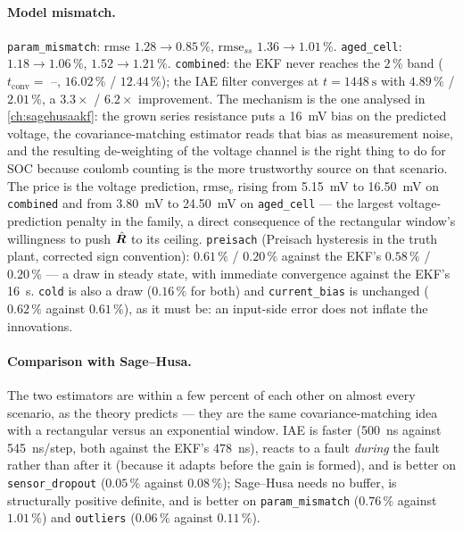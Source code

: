 \paragraph{Model mismatch.}  \texttt{param\_mismatch}: $\mathrm{rmse}$ $1.28\to0.85\,\%$,
$\mathrm{rmse}_{ss}$ $1.36\to1.01\,\%$.  \texttt{aged\_cell}: $1.18\to1.06\,\%$,
$1.52\to1.21\,\%$.  \texttt{combined}: the EKF never reaches the $2\,\%$ band
($t_\mathrm{conv}=$ --, $16.02\,\%$ / $12.44\,\%$); the IAE filter converges at
$t=\SI{1448}{\second}$ with $4.89\,\%$ / $\mathbf{2.01\,\%}$, a $3.3\times$ / $6.2\times$
improvement.  The mechanism is the one analysed in \cref{ch:sagehusaakf}: the grown series
resistance puts a \SI{16}{\milli\volt} bias on the predicted voltage, the covariance-matching
estimator reads that bias as measurement noise, and the resulting de-weighting of the voltage channel
is the right thing to do for SOC because coulomb counting is the more trustworthy source on that
scenario.  The price is the voltage prediction, $\mathrm{rmse}_v$ rising from \SI{5.15}{\milli\volt}
to \SI{16.50}{\milli\volt} on \texttt{combined} and from \SI{3.80}{\milli\volt} to
\SI{24.50}{\milli\volt} on \texttt{aged\_cell} --- the largest voltage-prediction penalty in the
family, a direct consequence of the rectangular window's willingness to push $\hat{\bm{R}}$ to its
ceiling.  \texttt{preisach} (Preisach hysteresis in the truth plant, corrected sign convention):
$0.61\,\%$ / $0.20\,\%$ against the EKF's $0.58\,\%$ / $0.20\,\%$ --- a draw in steady state, with
immediate convergence against the EKF's \SI{16}{\second}.  \texttt{cold} is also a draw
($0.16\,\%$ for both) and \texttt{current\_bias} is unchanged ($0.62\,\%$ against $0.61\,\%$), as it
must be: an input-side error does not inflate the innovations.

\paragraph{Comparison with Sage--Husa.}  The two estimators are within a few percent of each other on
almost every scenario, as the theory predicts --- they are the same covariance-matching idea with a
rectangular versus an exponential window.  IAE is faster (\SI{500}{\nano\second} against
\SI{545}{\nano\second}/step, both against the EKF's \SI{478}{\nano\second}), reacts to a fault
\emph{during} the fault rather than after it (because it adapts before the gain is formed), and is
better on \texttt{sensor\_dropout} ($0.05\,\%$ against $0.08\,\%$); Sage--Husa needs no buffer, is
structurally positive definite, and is better on \texttt{param\_mismatch} ($0.76\,\%$ against
$1.01\,\%$) and \texttt{outliers} ($0.06\,\%$ against $0.11\,\%$).


